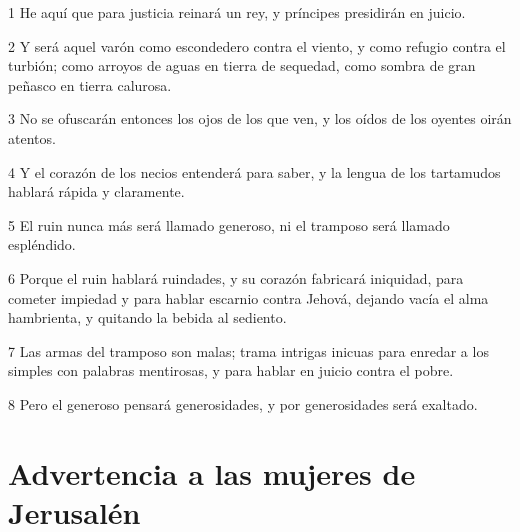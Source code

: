 \par 1 He aquí que para justicia reinará un rey, y príncipes presidirán en juicio.
\par 2 Y será aquel varón como escondedero contra el viento, y como refugio contra el turbión; como arroyos de aguas en tierra de sequedad, como sombra de gran peñasco en tierra calurosa.
\par 3 No se ofuscarán entonces los ojos de los que ven, y los oídos de los oyentes oirán atentos.
\par 4 Y el corazón de los necios entenderá para saber, y la lengua de los tartamudos hablará rápida y claramente.
\par 5 El ruin nunca más será llamado generoso, ni el tramposo será llamado espléndido.
\par 6 Porque el ruin hablará ruindades, y su corazón fabricará iniquidad, para cometer impiedad y para hablar escarnio contra Jehová, dejando vacía el alma hambrienta, y quitando la bebida al sediento.
\par 7 Las armas del tramposo son malas; trama intrigas inicuas para enredar a los simples con palabras mentirosas, y para hablar en juicio contra el pobre.
\par 8 Pero el generoso pensará generosidades, y por generosidades será exaltado.

\section*{Advertencia a las mujeres de Jerusalén}

